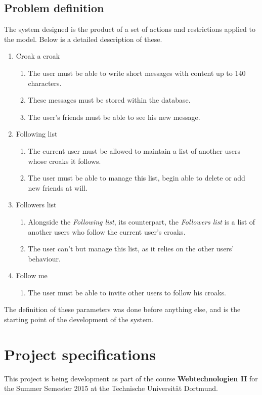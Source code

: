 \documentclass[paper=a4, fontsize=12pt]{scrartcl}
\numberwithin{equation}{section}    %
\numberwithin{figure}{section}      %
\numberwithin{table}{section}        %
\begin{document}
\subsection{Problem definition}
The system designed is the product of a set of actions and restrictions applied to the model.
Below is a detailed description of these.
\begin{enumerate}
  \item Croak a croak
  \begin{enumerate}
    \item The user must be able to write short messages with content up to 140 characters.
    \item These messages must be stored within the database.
    \item The user's friends must be able to see his new message.
  \end{enumerate}
  \item Following list
  \begin{enumerate}
    \item The current user must be allowed to maintain a list of another users whose croaks it follows.
    \item The user must be able to manage this list, begin able to delete or add new friends at will.
  \end{enumerate}
  \item Followers list
  \begin{enumerate}
    \item Alongside the \emph{Following list}, its counterpart, the \emph{Followers list} is a list of another users who follow the current user's croaks.
    \item The user can't but manage this list, as it relies on the other users' behaviour.
  \end{enumerate}
  \item Follow me
  \begin{enumerate}
    \item The user must be able to invite other users to follow his croaks.
  \end{enumerate}
\end{enumerate}

The definition of these parameters was done before anything else, and is the starting point of the development of the system.

\pagebreak
\section{Project specifications}
This project is being development as part of the course \textbf{Webtechnologien II}
for the Summer Semester 2015 at the Technische Universit\"at Dortmund.
\end{document}
